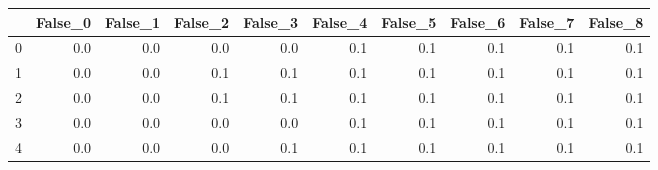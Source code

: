 \begin{tabular}{lrrrrrrrrr}
\toprule
{} &  False\_0 &  False\_1 &  False\_2 &  False\_3 &  False\_4 &  False\_5 &  False\_6 &  False\_7 &  False\_8 \\ \hline
\midrule
0 &      0.0 &      0.0 &      0.0 &      0.0 &      0.1 &      0.1 &      0.1 &      0.1 &      0.1 \\ \hline
1 &      0.0 &      0.0 &      0.1 &      0.1 &      0.1 &      0.1 &      0.1 &      0.1 &      0.1 \\ \hline
2 &      0.0 &      0.0 &      0.1 &      0.1 &      0.1 &      0.1 &      0.1 &      0.1 &      0.1 \\ \hline
3 &      0.0 &      0.0 &      0.0 &      0.0 &      0.1 &      0.1 &      0.1 &      0.1 &      0.1 \\ \hline
4 &      0.0 &      0.0 &      0.0 &      0.1 &      0.1 &      0.1 &      0.1 &      0.1 &      0.1 \\ \hline
\bottomrule
\end{tabular}
